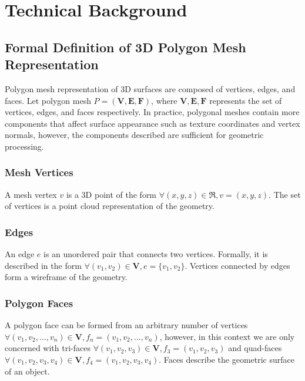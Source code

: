 \documentclass[ %
                    author={Dillon Keith Diep},
                supervisor={Dr. Carl Henrik Ek},
                    degree={MEng},
                     title={Assisted Content Generation for 3D Hair Geometry},
                  subtitle={[INCOMPLETE DRAFT, CONTAINS NOTES FROM RESEARCH]},
                      type={Research},
                      year={2014} ]{dissertation}
\begin{document}

\chapter{Technical Background}
\label{chap:technical}

\section{Formal Definition of 3D Polygon Mesh Representation}

Polygon mesh representation of 3D surfaces are composed of vertices, edges, and faces. Let polygon mesh $P = (\mathbf{V, E, F})$, where $\mathbf{V, E, F}$ represents the set of vertices, edges, and faces respectively. In practice, polygonal meshes contain more components that affect surface appearance such as texture coordinates and vertex normals, however, the components described are sufficient for geometric processing.

\subsection{Mesh Vertices}
A mesh vertex $v$ is a 3D point of the form $\forall (x, y, z) \in \Re, v = (x, y, z)$.
The set of vertices is a point cloud representation of the geometry. 

\subsection{Edges}
An edge $e$ is an unordered pair that connects two vertices. Formally, it is described in the form $\forall (v_1, v_2) \in \mathbf{V}, e = \{v_1, v_2\}$. Vertices connected by edges form a wireframe of the geometry. 

\subsection{Polygon Faces}
A polygon face can be formed from an arbitrary number of vertices $\forall (v_1, v_2,...,v_n) \in \mathbf{V}, f_n = (v_1, v_2,..., v_n)$, however, in this context we are only concerned with tri-faces $\forall (v_1, v_2, v_3) \in \mathbf{V}, f_3 = (v_1, v_2, v_3)$ and quad-faces $\forall (v_1, v_2, v_3, v_4) \in \mathbf{V}, f_4 = (v_1, v_2, v_3, v_4)$. Faces describe the geometric surface of an object. 
\end{document}
